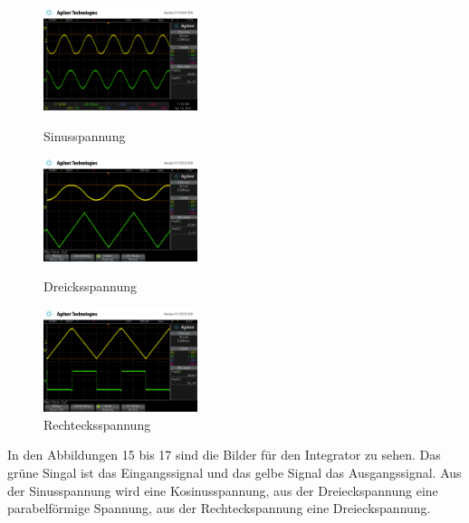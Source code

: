 \documentclass{scrartcl}
\begin{document}
\begin{figure}[H]%
\centering
\includegraphics[width=0.4\textwidth]{aufnahmen_neu/scope_187.png}
\caption{Sinusspannung }
\label{verstaerker}

\includegraphics[width=0.4\textwidth]{aufnahmen_neu/scope_189.png}
\caption{Dreicksspannung}
\label{verstaerker}

\includegraphics[width=0.4\textwidth]{aufnahmen_neu/scope_188.png}
\caption{Rechtecksspannung}
\label{verstaerker}

\end{figure}
In den Abbildungen 15 bis 17 sind die Bilder für den Integrator zu sehen.  Das grüne Singal ist das Eingangssignal und das gelbe Signal das Ausgangssignal.
Aus der Sinusspannung wird eine Kosinusspannung, aus der Dreieckspannung eine parabelförmige Spannung, aus der Rechteckspannung eine Dreieckspannung.
\end{document}
